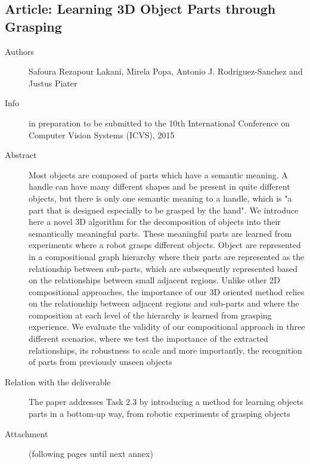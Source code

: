 \documentclass[a4paper,11pt,pdf]{pacmanreport}
\begin{document}
\subsection{Article: Learning 3D Object Parts through Grasping} \label{ann:icvs}
\begin{description}
	\item[Authors] Safoura Rezapour Lakani, Mirela Popa, Antonio J. Rodriguez-Sanchez and Justus Piater
	\item[Info] in preparation to be submitted to the 10th International Conference on Computer Vision Systems (ICVS), 2015
	\item[Abstract] Most objects are composed of parts which have a semantic 
meaning. A handle can have many different shapes and be present in quite 
different objects, but there is only one semantic meaning to a handle, which is 
"a part that is designed especially to be grasped by the hand". We introduce 
here a novel 3D algorithm for the decomposition of objects into their 
semantically meaningful parts. These meaningful parts are learned from 
experiments where a robot grasps different objects. Object are represented in a 
compositional graph hierarchy where their parts are represented as the 
relationship between sub-parts, which are subsequently represented based on the 
relationships between small adjacent regions. Unlike other 2D compositional 
approaches, the importance of our 3D oriented method relies on the relationship 
between adjacent regions and sub-parts and where the composition at each level 
of the hierarchy is learned from grasping experience. We evaluate the validity 
of our compositional approach in three different scenarios, where we test the 
importance of the extracted relationships, its robustness to scale and more 
importantly, the recognition of parts from previously unseen objects
	\item[Relation with the deliverable] The paper addresses Task 2.3 by introducing a method for learning objects parts 
in a bottom-up way, from robotic experiments of grasping objects

    \item[Attachment] (following pages until next annex)
\end{description}

\end{document}
